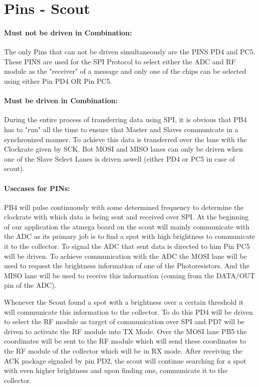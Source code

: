 \documentclass[12pt]{article}
\begin{document}
\lstset{language=C++}

\section*{Pins - Scout}

\paragraph{Must not be driven in Combination:}
The only Pins that can not be driven simultaneously are the PINS PD4 and PC5. These PINS are used for the SPI Protocol to select either the ADC and RF module as the "receiver" of a message and only one of the chips can be selected using either Pin PD4 OR Pin PC5.

\paragraph{Must be driven in Combination:}
During the entire process of transferring data using SPI, it is obvious that PB4 has to "run" all the time to ensure that Master and Slaves communicate in a  synchronized manner. To achieve this data is transferred over the lane with the Clockrate given by SCK. Bot MOSI and MISO lanes can only be driven when one of the Slave Select Lanes is driven aswell (either PD4 or PC5 in case of scout).

\paragraph{Usecases for PINs:} PB4 will pulse continuously with some determined frequency to determine the clockrate with which data is being sent and received over SPI. At the beginning of our application the atmega board on the scout will mainly communicate with the ADC as its primary job is to find a spot with high brightness to communicate it to the collector. To signal the ADC that sent data is directed to him Pin PC5 will be driven. To achieve communication with the ADC the MOSI lane will be used to request the brightness information of one of the Photoresistors. And the MISO lane will be used to receive this information (coming from the DATA/OUT pin of the ADC).

Whenever the Scout found a spot with a brightness over a certain threshold it will communicate this information to the collector. To do this PD4 will be driven to select the RF module as target of communication over SPI and PD7 will be driven to activate the RF module into TX Mode. Over the MOSI lane PB5 the coordinates will be sent to the RF module which will send these coordinates to the RF module of the collector which will be in RX mode. After receiving the ACK package signaled by pin PD2, the scout will continue searching for a spot with even higher brightness and upon finding one, communicate it to the collector.
\end{document}
